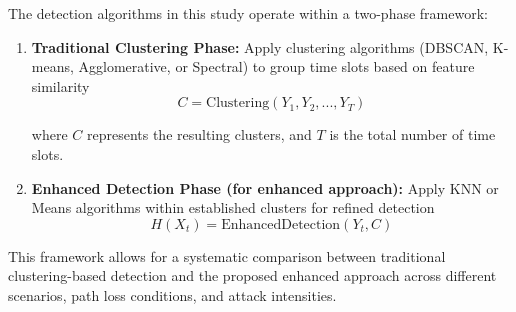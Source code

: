 The detection algorithms in this study operate within a two-phase framework:

\begin{enumerate}
    \item \textbf{Traditional Clustering Phase:} Apply clustering algorithms (DBSCAN, K-means, Agglomerative, or Spectral) to group time slots based on feature similarity
    \begin{equation}
        C = \text{Clustering}(Y_1, Y_2, ..., Y_T)
    \end{equation}
    
    where $C$ represents the resulting clusters, and $T$ is the total number of time slots.
    
    \item \textbf{Enhanced Detection Phase (for enhanced approach):} Apply KNN or Means algorithms within established clusters for refined detection
    \begin{equation}
        H(X_t) = \text{EnhancedDetection}(Y_t, C)
    \end{equation}
\end{enumerate}

This framework allows for a systematic comparison between traditional clustering-based detection and the proposed enhanced approach across different scenarios, path loss conditions, and attack intensities.
